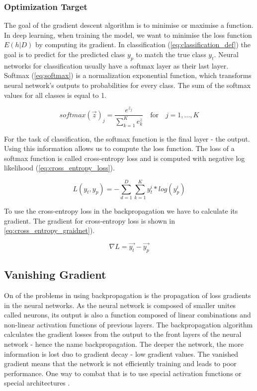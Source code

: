 \documentclass[times, utf8, diplomski]{fer}
\begin{document}
\subsubsection{Optimization Target}

The goal of the gradient descent algorithm is to minimise or maximise a function. In deep learning, when training the model, we want to minimise the loss function $E(h|D)$ by computing its gradient. In classification (\ref{eq:classification_def}) the goal is to predict for the predicted class $y_p$ to match the true class $y_t$. Neural networks for classification usually have a softmax layer as their last layer. Softmax (\ref{eq:softmax}) is a normalization exponential function, which transforms neural network's outputs to probabilities for every class. The sum of the softmax values for all classes is equal to 1.  

\begin{equation}
\label{eq:softmax}
	softmax(\vec{z})_j = \frac{e^{z_j}}{\displaystyle\sum_{k=1}^{K} e^{z}_k} \quad \text{for} \quad j = 1, ..., K
\end{equation} 

For the task of classification, the softmax function is the final layer - the output. Using this information allows us to compute the loss function. The loss of a softmax function is called cross-entropy loss and is computed with negative log likelihood (\ref{eq:cross_entropy_loss}).

\begin{equation}
\label{eq:cross_entropy_loss}
	L(y_t, y_p) = - \displaystyle\sum_{d=1}^{D} \sum_{k=1}^{K} y^i_t * log(y^i_p) 
\end{equation}

To use the cross-entropy loss in the backpropagation we have to calculate its gradient. The gradient for cross-entropy loss is shown in \ref{eq:cross_entropy_graidnet}).

\begin{equation}
\label{eq:cross_entropy_graidnet}
 \nabla{L} = \vec{y_t} - \vec{y_p}
\end{equation}

\subsection{Vanishing Gradient}
\label{se:vanishing_gradient}

On of the problems in using backpropagation is the propagation of loss gradients in the neural networks. As the neural network is composed of smaller unites called neurons, its output is also a function composed of linear combinations and non-linear activation functions of previous layers. The backpropagation algorithm calculates the gradient losses from the output to the front layers of the neural network - hence the name backpropagation. The deeper the network, the more information is lost duo to gradient decay - low gradient values. The vanished gradient means that the network is not efficiently training and leads to poor performance. One way to combat that is to use special activation functions \citep{clevert_fast_2015, xu_empirical_2015, he_delving_2015} or special architectures \citep{he_deep_2016}. 
\end{document}
